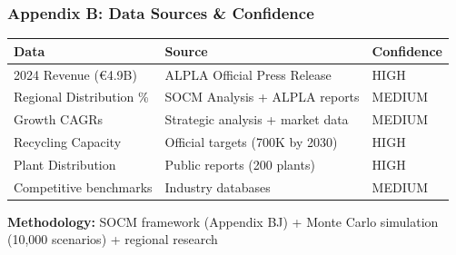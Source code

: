 \documentclass[aspectratio=169,12pt,xcolor=dvipsnames]{beamer}
\begin{document}
\begin{frame}
  \frametitle{Appendix B: Data Sources \& Confidence}

  \begin{tabular}{|p{2.5cm}|p{3.5cm}|p{2cm}|}
    \hline
    \textbf{Data} & \textbf{Source} & \textbf{Confidence} \\
    \hline
    2024 Revenue (€4.9B) & ALPLA Official Press Release & HIGH \\
    \hline
    Regional Distribution \% & SOCM Analysis + ALPLA reports & MEDIUM \\
    \hline
    Growth CAGRs & Strategic analysis + market data & MEDIUM \\
    \hline
    Recycling Capacity & Official targets (700K by 2030) & HIGH \\
    \hline
    Plant Distribution & Public reports (200 plants) & HIGH \\
    \hline
    Competitive benchmarks & Industry databases & MEDIUM \\
    \hline
  \end{tabular}

  \vspace{1cm}

  \textbf{Methodology:} SOCM framework (Appendix BJ) + Monte Carlo simulation (10,000 scenarios) + regional research

\end{frame}
\end{document}
